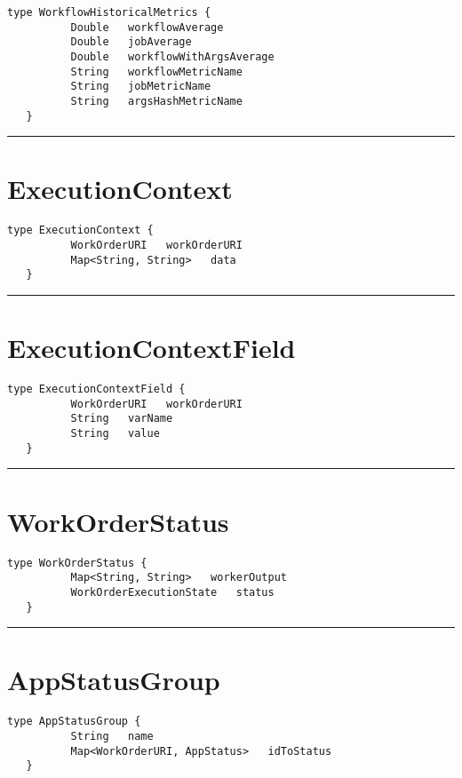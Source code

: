 \begin{lstlisting}[style=nonumbers]
   type WorkflowHistoricalMetrics {
          Double   workflowAverage
          Double   jobAverage
          Double   workflowWithArgsAverage
          String   workflowMetricName
          String   jobMetricName
          String   argsHashMetricName
   }
\end{lstlisting}

\rule{12cm}{2pt}
\section{ExecutionContext}
\label{type:ExecutionContext}

\begin{lstlisting}[style=nonumbers]
   type ExecutionContext {
          WorkOrderURI   workOrderURI
          Map<String, String>   data
   }
\end{lstlisting}

\rule{12cm}{2pt}
\section{ExecutionContextField}
\label{type:ExecutionContextField}

\begin{lstlisting}[style=nonumbers]
   type ExecutionContextField {
          WorkOrderURI   workOrderURI
          String   varName
          String   value
   }
\end{lstlisting}

\rule{12cm}{2pt}
\section{WorkOrderStatus}
\label{type:WorkOrderStatus}

\begin{lstlisting}[style=nonumbers]
   type WorkOrderStatus {
          Map<String, String>   workerOutput
          WorkOrderExecutionState   status
   }
\end{lstlisting}

\rule{12cm}{2pt}
\section{AppStatusGroup}
\label{type:AppStatusGroup}

\begin{lstlisting}[style=nonumbers]
   type AppStatusGroup {
          String   name
          Map<WorkOrderURI, AppStatus>   idToStatus
   }
\end{lstlisting}

